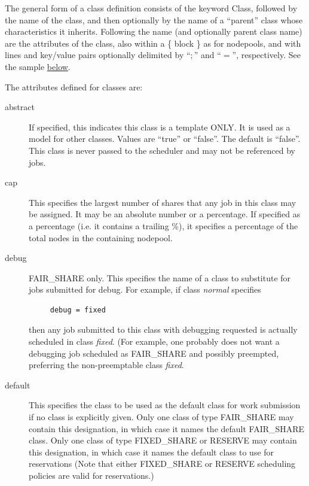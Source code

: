     The general form of a class definition consists of the keyword Class, followed
    by the name of the class, and then optionally by the name of a ``parent'' class
    whose characteristics it inherits.   Following the name (and optionally parent class
    name) are the attributes of the class, also within a \{ block \} as for nodepools, and
    with lines and key/value pairs optionally delimited by  ``$;$'' and ``$=$'', respectively.
    See the sample \hyperref[fig:class.configuration]{below}.

    The attributes defined for classes are:
    \begin{description}

      \item[abstract] If specified, this indicates this class is a template ONLY. It is used
        as a model for other classes.  Values are ``true'' or ``false''.  The default is
        ``false''.  This class is never passed to the scheduler and may not be referenced
        by jobs.

      \item[cap] This specifies the largest number of shares that any job in this class
        may be assigned.  It may be an absolute number or a percentage.  If specified as
        a percentage (i.e. it contains a trailing \%), it specifies a percentage of the
        total nodes in the containing nodepool.

      \item[debug] FAIR\_SHARE only. This specifies the name of a class to substitute
        for jobs submitted for debug.  For example, if class {\em normal} specifies
\begin{verbatim}
     debug = fixed
\end{verbatim}
        then any job submitted to this class with debugging requested is actually scheduled
        in class {\em fixed}. (For example, one probably does not want a debugging job
        scheduled as FAIR\_SHARE and possibly preempted, preferring the non-preemptable
        class {\em fixed}.

      \item[default] This specifies the class to be used as the default class for work submission
        if no class is explicitly given.  Only one class of type FAIR\_SHARE may contain this
        designation, in which case it names the default FAIR\_SHARE class.  Only one class of type
        FIXED\_SHARE or RESERVE may contain this designation, in which case it names the default
        class to use for reservations (Note that either FIXED\_SHARE or RESERVE scheduling policies
        are valid for reservations.)


\end{description}
